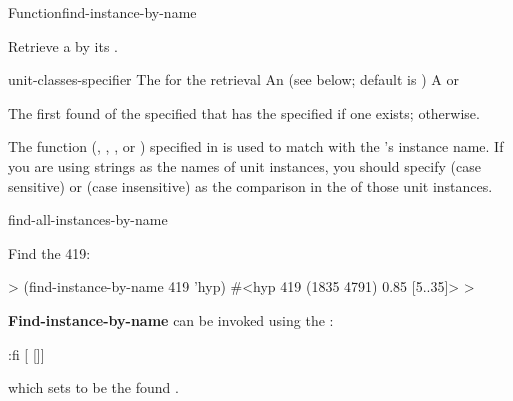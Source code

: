 \documentclass[10pt,twoside,english,pdftex]{article}
\begin{document}

\begin{functiondoc}{Function}{find-instance-by-name}{
      
    \returns{} } 
%
%
%

\fnsyntax

\fnpurpose Retrieve a  by its .

\fnpackage {}

\fnmodule {}

\fnargs
\begin{args}{unit-classes-specifier}
 The  for the retrieval
 An 
(see below; default is )
 A  or \nil{}
\end{args}

\fnreturns The first  found of the specified
 that has the specified  if one exists;
\nil{} otherwise.

\fndsyntax
\W\supp\tabletop
\unitclassspec
\subclassingspec

\fndescription The  function (,
, , or ) specified in
\textbf{} is used to match 
with the 's instance name.  If you are using strings as
the names of unit instances, you should specify  (case sensitive)
or  (case insensitive) as the comparison  in the
 of those unit instances.

\begin{alsos}{find-all-instances-by-name}
\end{alsos}

\fnexample
Find the   419:
%
\W\supp
\begin{example}
  > (find-instance-by-name 419 'hyp)
  #<hyp 419 (1835 4791) 0.85 [5..35]>
  >
\end{example}

\fnnote 
%
%
%
\textbf{Find-instance-by-name} can be invoked using the :
%
\W\supp
\begin{example}
  :fi \textrm{[} \textrm{[}\textrm{]]}
\end{example}
%
which sets \code{=} to be the found .

\end{functiondoc}
\end{document}
